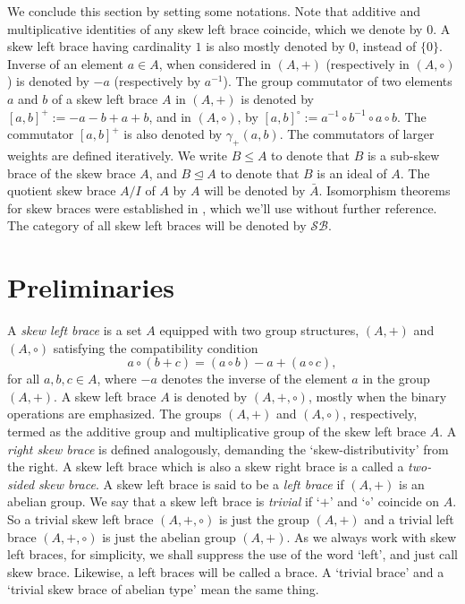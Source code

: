 \documentclass[11pt]{amsart}
\theoremstyle{thrm}
\theoremstyle{plain}
\theoremstyle{definition}
\numberwithin{equation}{section}
\begin{document}
 We conclude this section by setting some notations. Note that additive and multiplicative identities of any skew left brace coincide, which we denote by $0$. A skew left brace having cardinality $1$ is also mostly denoted by $0$, instead of $\{0\}$.  Inverse of  an element $a \in A$, when considered in $(A, +)$  (respectively in $(A, \circ)$)  is denoted by $-a$  (respectively by $a^{-1}$). The group commutator of two elements $a$ and $b$ of a skew left brace $A$ in $(A, +)$ is denoted  by $[a, b]^{+} := -a - b + a + b$, and in $(A, \circ)$, by $[a, b]^{\circ} := a^{-1} \circ b^{-1} \circ  a \circ b $. The commutator  $[a, b]^{+}$ is also denoted by $\gamma_{+}(a, b)$. The commutators of larger weights are defined iteratively.  We write $B \le A$ to denote that $B$ is a sub-skew brace of the skew  brace $A$, and $B \trianglelefteq A$ to denote that $B$ is an ideal  of  $A$.   The quotient skew brace  $A/I$ of $A$ by $A$ will be denoted by $\bar{A}$. Isomorphism theorems for skew braces were established in \cite{BEP24}, which we'll use without further reference. The category of all skew left braces will be denoted by $\mathcal{SB}$.


\section{Preliminaries}

A {\it skew left brace} is a set \(A\) equipped with two group structures, \((A, +)\) and \((A, \circ)\) satisfying the compatibility condition
\[a\circ (b  +  c) = (a \circ b) - a + (a \circ c),\]
for all \( a,b,c \in A\), where \(- a\) denotes the inverse of the element $a$ in the group \((A, +)\).  A skew left brace $A$ is denoted by $(A, +, \circ)$, mostly when the binary operations are emphasized.  The groups  \((A, +)\) and \((A, \circ)\), respectively, termed as the additive group and multiplicative group of the skew left brace $A$.  A {\it right skew brace} is defined analogously, demanding the  `skew-distributivity' from the right. A skew left brace which is also a skew right brace is a called a {\it two-sided skew brace}. A skew left brace is said to be a {\it left brace} if $(A, +)$ is an abelian group.  We say that a skew left brace is {\it trivial} if `$+$' and `$\circ$' coincide on $A$. So a trivial skew left brace $(A, +, \circ)$ is just the group $(A, +)$ and a trivial left  brace $(A, +, \circ)$ is just the abelian group $(A, +)$. As we always work with skew left braces, for  simplicity, we shall  suppress the use of the word `left', and just call skew brace. Likewise, a left braces will be called a brace.  A `trivial brace' and a `trivial skew brace of abelian type' mean the  same thing.
\end{document}
